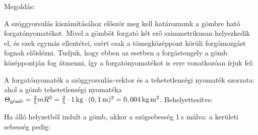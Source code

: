  
\ifdefined\megoldas 
  
 Megoldás: 

 A szöggyorsulás kiszámításához először meg kell határoznunk a gömbre ható forgatónyomatékot. Mivel a gömböt forgató két erő szimmetrikusan helyezkedik el, és ezek egymás ellentétei, ezért csak a tömegközéppont körüli forgómozgást fognak előidézni. Tudjuk, hogy ebben az esetben a forgástengely a gömb középpontján fog átmenni, így a forgatónyomatékot is erre vonatkozóan írjuk fel:

 A forgatónyomaték a szöggyorsulás-vektor és a tehetetlenségi nyomaték szorzata:
 \al{ 
  \Mv = \Theta \betav\;,
 }
 ahol a gömb tehetetlenségi nyomatéka $\Theta_\text{gömb}=\frac{2}{5}mR^2=\frac{2}{5}\cdot 1\mathrm{\, kg}\cdot (0,1\mathrm{\, m})^2=0,004\mathrm{\, kg\,m^2}$. Behelyettesítve:

 Ha álló helyzetből indult a gömb, akkor a szögsebesség 1$\mathrm{\, s}$ múlva:
 a kerületi sebesség pedig:
 
\fi